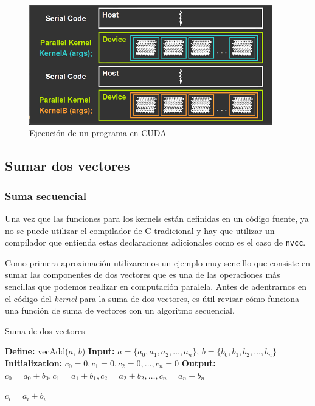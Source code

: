 \begin{figure}[H]
  \centering
  \includegraphics[width=400px]{./images/execution_cuda.png}
  \caption{Ejecución de un programa en CUDA}
  \label{fig:execution_cuda}
\end{figure}

\subsection{Sumar dos vectores}

\subsubsection{Suma secuencial}

Una vez que las funciones para los kernels están definidas en un código fuente, ya no se puede utilizar el compilador de
C tradicional y hay que utilizar un compilador que entienda estas declaraciones adicionales como es el caso de
\texttt{nvcc}.

Como primera aproximación utilizaremos un ejemplo muy sencillo que consiste en sumar las componentes de dos vectores que
es una de las operaciones más sencillas que podemos realizar en computación paralela. Antes de adentrarnos en el código
del \textit{kernel} para la suma de dos vectores, es útil revisar cómo funciona una función de suma de vectores con un
algoritmo secuencial.

\begin{algorithm}
\caption{Suma de dos vectores}
  \label{alg:vecAdd}
  \begin{algorithmic}[1]
  \Statex \textbf{Define:} vecAdd($a$, $b$)
  \Statex \textbf{Input:} $a = \{a_0, a_1, a_2, \ldots, a_n\}$, $b = \{b_0, b_1, b_2, \ldots, b_n\}$
  \Statex \textbf{Initialization:} $c_0 = 0, c_1 = 0, c_2 = 0, \ldots, c_n = 0$
  \Statex \textbf{Output:} $c_0 = a_0 + b_0, c_1 = a_1 + b_1, c_2 = a_2 + b_2, \ldots, c_n = a_n + b_n$

    \State $c_i = a_i + b_i$
  \EndFor
  \end{algorithmic}
\end{algorithm}


